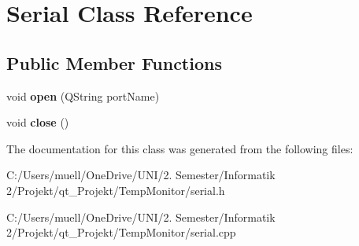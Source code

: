 \hypertarget{class_serial}{}\section{Serial Class Reference}
\label{class_serial}
\subsection*{Public Member Functions}
\begin{DoxyCompactItemize}
\item 
void {\bfseries open} (Q\+String port\+Name)\hypertarget{class_serial_a8bfba783b2b4988c43d1347149ee164f}{}\label{class_serial_a8bfba783b2b4988c43d1347149ee164f}

\item 
void {\bfseries close} ()\hypertarget{class_serial_afbe59407e718bc3d22ea4a67b304db6c}{}\label{class_serial_afbe59407e718bc3d22ea4a67b304db6c}

\end{DoxyCompactItemize}


The documentation for this class was generated from the following files\+:\begin{DoxyCompactItemize}
\item 
C\+:/\+Users/muell/\+One\+Drive/\+U\+N\+I/2. Semester/\+Informatik 2/\+Projekt/qt\+\_\+\+Projekt/\+Temp\+Monitor/serial.\+h\item 
C\+:/\+Users/muell/\+One\+Drive/\+U\+N\+I/2. Semester/\+Informatik 2/\+Projekt/qt\+\_\+\+Projekt/\+Temp\+Monitor/serial.\+cpp\end{DoxyCompactItemize}
